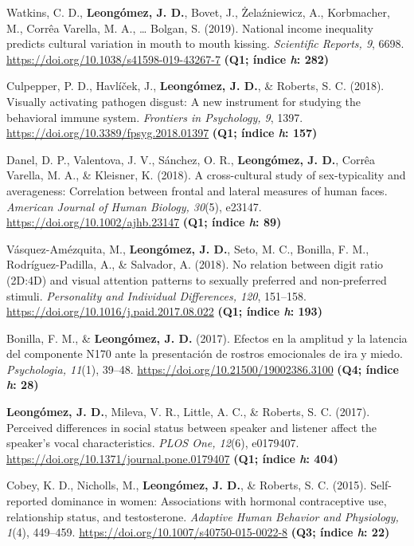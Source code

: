 \documentclass[11pt,a4paper,]{awesome-cv}
\begin{document}
Watkins, C. D., \textbf{Leongómez, J. D.}, Bovet, J., Żelaźniewicz, A.,
Korbmacher, M., Corrêa Varella, M. A., \ldots{} Bolgan, S. (2019).
National income inequality predicts cultural variation in mouth to mouth
kissing. \emph{Scientific Reports, 9}, 6698.
\url{https://doi.org/10.1038/s41598-019-43267-7} \textbf{(Q1; índice
\emph{h}: 282)}

Culpepper, P. D., Havlíček, J., \textbf{Leongómez, J. D.}, \& Roberts,
S. C. (2018). Visually activating pathogen disgust: A new instrument for
studying the behavioral immune system. \emph{Frontiers in Psychology,
9}, 1397. \url{https://doi.org/10.3389/fpsyg.2018.01397} \textbf{(Q1;
índice \emph{h}: 157)}

Danel, D. P., Valentova, J. V., Sánchez, O. R.,
\textbf{Leongómez, J. D.}, Corrêa Varella, M. A., \& Kleisner, K.
(2018). A cross-cultural study of sex-typicality and averageness:
Correlation between frontal and lateral measures of human faces.
\emph{American Journal of Human Biology, 30}(5), e23147.
\url{https://doi.org/10.1002/ajhb.23147} \textbf{(Q1; índice \emph{h}:
89)}

Vásquez-Amézquita, M., \textbf{Leongómez, J. D.}, Seto, M. C., Bonilla,
F. M., Rodríguez-Padilla, A., \& Salvador, A. (2018). No relation
between digit ratio (2D:4D) and visual attention patterns to sexually
preferred and non-preferred stimuli. \emph{Personality and Individual
Differences, 120}, 151--158.
\url{https://doi.org/10.1016/j.paid.2017.08.022} \textbf{(Q1; índice
\emph{h}: 193)}

Bonilla, F. M., \& \textbf{Leongómez, J. D.} (2017). Efectos en la
amplitud y la latencia del componente N170 ante la presentación de
rostros emocionales de ira y miedo. \emph{Psychologia, 11}(1), 39--48.
\url{https://doi.org/10.21500/19002386.3100} \textbf{(Q4; índice
\emph{h}: 28)}

\textbf{Leongómez, J. D.}, Mileva, V. R., Little, A. C., \& Roberts, S.
C. (2017). Perceived differences in social status between speaker and
listener affect the speaker's vocal characteristics. \emph{PLOS One,
12}(6), e0179407. \url{https://doi.org/10.1371/journal.pone.0179407}
\textbf{(Q1; índice \emph{h}: 404)}

Cobey, K. D., Nicholls, M., \textbf{Leongómez, J. D.}, \& Roberts, S. C.
(2015). Self-reported dominance in women: Associations with hormonal
contraceptive use, relationship status, and testosterone. \emph{Adaptive
Human Behavior and Physiology, 1}(4), 449--459.
\url{https://doi.org/10.1007/s40750-015-0022-8} \textbf{(Q3; índice
\emph{h}: 22)}
\end{document}
